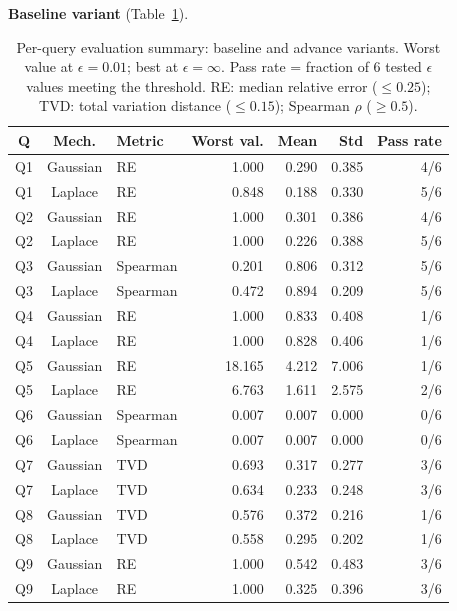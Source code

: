\documentclass[12pt,letterpaper]{article}
\begin{document}
\begin{table}[H]
\centering
\caption{Per-query evaluation summary: baseline and advance variants. Worst value at $\epsilon=0.01$; best at $\epsilon=\infty$. Pass rate = fraction of 6 tested $\epsilon$ values meeting the threshold. RE: median relative error ($\leq 0.25$); TVD: total variation distance ($\leq 0.15$); Spearman $\rho$ ($\geq 0.5$).}
\label{tab:eval_summary_baseline}
\smallskip
\noindent\textbf{Baseline variant} (Table~\ref{tab:eval_summary_baseline}).\\
\footnotesize
\renewcommand{\arraystretch}{0.92}
\begin{tabular}{@{}cclrrrr@{}}
\toprule
\textbf{Q} & \textbf{Mech.} & \textbf{Metric} & \textbf{Worst val.} & \textbf{Mean} & \textbf{Std} & \textbf{Pass rate} \\
\midrule
Q1 & Gaussian & RE      & 1.000  & 0.290 & 0.385 & 4/6 \\
Q1 & Laplace  & RE      & 0.848  & 0.188 & 0.330 & 5/6 \\
Q2 & Gaussian & RE      & 1.000  & 0.301 & 0.386 & 4/6 \\
Q2 & Laplace  & RE      & 1.000  & 0.226 & 0.388 & 5/6 \\
Q3 & Gaussian & Spearman & 0.201 & 0.806 & 0.312 & 5/6 \\
Q3 & Laplace  & Spearman & 0.472 & 0.894 & 0.209 & 5/6 \\
Q4 & Gaussian & RE      & 1.000  & 0.833 & 0.408 & 1/6 \\
Q4 & Laplace  & RE      & 1.000  & 0.828 & 0.406 & 1/6 \\
Q5 & Gaussian & RE      & 18.165 & 4.212 & 7.006 & 1/6 \\
Q5 & Laplace  & RE      & 6.763  & 1.611 & 2.575 & 2/6 \\
Q6 & Gaussian & Spearman & 0.007 & 0.007 & 0.000 & 0/6 \\
Q6 & Laplace  & Spearman & 0.007 & 0.007 & 0.000 & 0/6 \\
Q7 & Gaussian & TVD     & 0.693  & 0.317 & 0.277 & 3/6 \\
Q7 & Laplace  & TVD     & 0.634  & 0.233 & 0.248 & 3/6 \\
Q8 & Gaussian & TVD     & 0.576  & 0.372 & 0.216 & 1/6 \\
Q8 & Laplace  & TVD     & 0.558  & 0.295 & 0.202 & 1/6 \\
Q9 & Gaussian & RE      & 1.000  & 0.542 & 0.483 & 3/6 \\
Q9 & Laplace  & RE      & 1.000  & 0.325 & 0.396 & 3/6 \\

\end{tabular}
\end{table}
\end{document}
